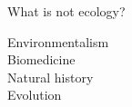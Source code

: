 \documentclass[12pt]{beamer}
\begin{document}



\begin{frame}

  {\Large  \textcolor{boss1}{What is not ecology?}} \\

\end{frame}






\begin{frame}

	\begin{flushright}
	  \Large \textcolor{boss2}{Environmentalism} \\
	  \Large \textcolor{boss3}{Biomedicine} \\
	  \Large \textcolor{boss4}{Natural history} \\
	  \Large \textcolor{boss4}{Evolution} \\
	\end{flushright}
\end{frame}



\begin{frame}

	\begin{flushright}
	  \Large \textcolor{boss2}{} 
	\end{flushright}
\end{frame}




\begin{frame}

	\begin{flushright}
	  \Large \textcolor{boss2}{} 
	\end{flushright}
\end{frame}
\end{document}
